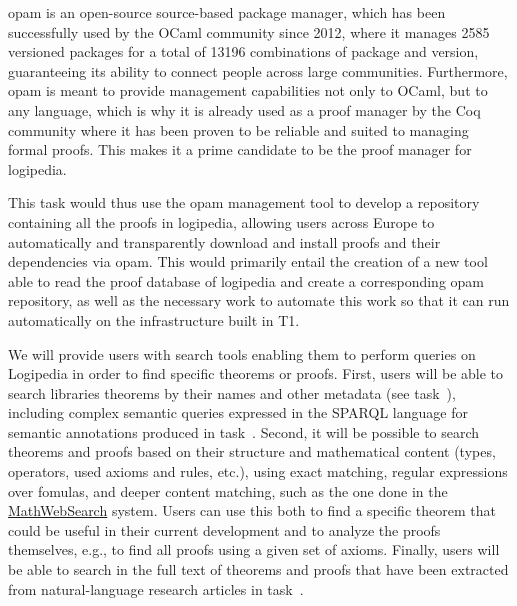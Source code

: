 \begin{workpackage}[id=access,wphases=0-48,type=MGT,
  short=Access,%
  title={Access to the infrastructure},
  lead=Inr,
  InrRM=28,
  OcaRM=6]
\begin{tasklist}
\begin{task}[id=opam,title=Giving access to the infrastructure in proof tools]
    opam \cite{opam} is an open-source source-based package manager, which has
    been successfully used by the OCaml community since 2012, where it manages
    2585 versioned packages for a total of 13196 combinations of package and
    version, guaranteeing its ability to connect people across large communities.
    Furthermore, opam is meant to provide management capabilities not only to
    OCaml, but to any language, which is why it is already used as a proof
    manager by the Coq community where it has been proven to be reliable and
    suited to managing formal proofs. This makes it a prime candidate to be the
    proof manager for logipedia.

    This task would thus use the opam management tool to develop a repository
    containing all the proofs in logipedia, allowing users across Europe to
    automatically and transparently download and install proofs and their
    dependencies via opam. This would primarily entail the creation of a new
    tool able to read the proof database of logipedia and create a corresponding
    opam repository, as well as the necessary work to automate this work so that
    it can run automatically on the infrastructure built in T1.

  \end{task}

  \begin{task}[id=search,title=Providing search
    tools,lead=Inr,InrRM=28,FauRM=24,SacRM=6,BolRM=4]
    We will provide users with search tools enabling them to perform
    queries on Logipedia in order to find specific theorems or proofs.
    First, users will be able to search libraries theorems by their
    names and other metadata (see task~), including complex semantic
    queries expressed in the SPARQL language for semantic annotations
    produced in task~. Second, it will be possible to
    search theorems and proofs based on their structure and mathematical
    content (types, operators, used axioms and rules, etc.), using exact
    matching, regular expressions over fomulas, and deeper content
    matching, such as the one done in the
    \hyperlink{https://kwarc.info/systems/mws/}{MathWebSearch} system. Users can
    use this both to find a specific theorem that
    could be useful in their current development and to analyze the
    proofs themselves, e.g., to find all proofs using a given set of
    axioms.    
    Finally, users will be able to
    search in the full text of theorems and proofs that have been
    extracted from natural-language research articles in
    task~.
  \end{task}


\end{tasklist}
\end{workpackage}
